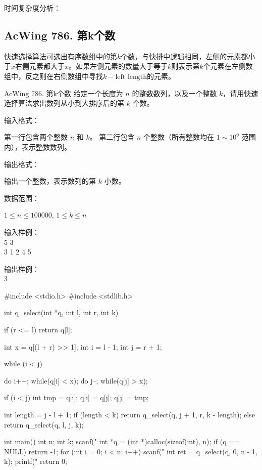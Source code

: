 时间复杂度分析：

\subsection{AcWing 786. 第k个数}
快速选择算法可选出有序数组中的第$k$个数，与快排中逻辑相同，左侧的元素都小于$x$右侧元素都大于$x$。如果左侧元素的数量大于等于$k$则表示第$k$个元素在左侧数组中，反之则在右侧数组中寻找$k-\text{left length}$的元素。

\begin{titledbox}{AcWing 786. 第k个数}
    给定一个长度为 $n$ 的整数数列，以及一个整数 $k$，请用快速选择算法求出数列从小到大排序后的第 $k$ 个数。

    输入格式：

    第一行包含两个整数 $n$ 和 $k$。
    第二行包含 $n$ 个整数（所有整数均在 $1 \sim 10^9$ 范围内），表示整数数列。

    输出格式：

    输出一个整数，表示数列的第 $k$ 小数。

    数据范围：

    $1 \le n \le 100000$,
    $1 \le k \le n$

    \begin{minipage}[t]{.5\textwidth}
        输入样例：\\
        5 3\\
        3 1 2 4 5
    \end{minipage}%
    \begin{minipage}[t]{.5\textwidth}
        输出样例：\\
        3
    \end{minipage}
\end{titledbox}


\begin{mycpptwocol}
    #include <stdio.h>
    #include <stdlib.h>

    int q_select(int *q, int l, int r, int k) {
        if (r <= l) {
            return q[l];
        }

        int x = q[(l + r) >> 1];
        int i = l - 1;
        int j = r + 1;

        while (i < j) {
            do i++; while(q[i] < x);
            do j--; while(q[j] > x);

            if (i < j) {
                int tmp = q[i];
                q[i] = q[j];
                q[j] = tmp;
            }
        }

        int length = j - l + 1;
        if (length < k) {
            return q_select(q, j + 1, r,
            k - length);
        } else {
            return q_select(q, l, j, k);
        }
    }

    int main() {
        int n;
        int k;
        scanf("%
        int *q = (int *)calloc(sizeof(int), n);
        if (q == NULL) {
            return -1;
        }
        for (int i = 0; i < n; i++) {
            scanf("%
        }
        int ret = q_select(q, 0, n - 1, k);
        printf("%
        return 0;
    }
\end{mycpptwocol}



